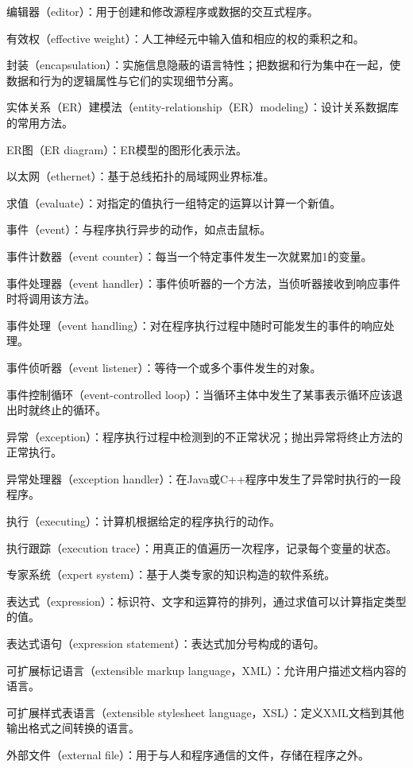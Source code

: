 编辑器（editor）：用于创建和修改源程序或数据的交互式程序。

有效权（effective weight）：人工神经元中输入值和相应的权的乘积之和。

封装（encapsulation）：实施信息隐蔽的语言特性；把数据和行为集中在一起，使数据和行为的逻辑属性与它们的实现细节分离。

实体关系（ER）建模法（entity-relationship（ER）modeling）：设计关系数据库的常用方法。

ER图（ER diagram）：ER模型的图形化表示法。

以太网（ethernet）：基于总线拓扑的局域网业界标准。

求值（evaluate）：对指定的值执行一组特定的运算以计算一个新值。

事件（event）：与程序执行异步的动作，如点击鼠标。

事件计数器（event counter）：每当一个特定事件发生一次就累加1的变量。

事件处理器（event handler）：事件侦听器的一个方法，当侦听器接收到响应事件时将调用该方法。

事件处理（event handling）：对在程序执行过程中随时可能发生的事件的响应处理。

事件侦听器（event listener）：等待一个或多个事件发生的对象。

事件控制循环（event-controlled loop）：当循环主体中发生了某事表示循环应该退出时就终止的循环。

异常（exception）：程序执行过程中检测到的不正常状况；抛出异常将终止方法的正常执行。

异常处理器（exception handler）：在Java或C++程序中发生了异常时执行的一段程序。

执行（executing）：计算机根据给定的程序执行的动作。

执行跟踪（execution trace）：用真正的值遍历一次程序，记录每个变量的状态。

专家系统（expert system）：基于人类专家的知识构造的软件系统。

表达式（expression）：标识符、文字和运算符的排列，通过求值可以计算指定类型的值。

表达式语句（expression statement）：表达式加分号构成的语句。

可扩展标记语言（extensible markup language，XML）：允许用户描述文档内容的语言。

可扩展样式表语言（extensible stylesheet language，XSL）：定义XML文档到其他输出格式之间转换的语言。

外部文件（external file）：用于与人和程序通信的文件，存储在程序之外。

